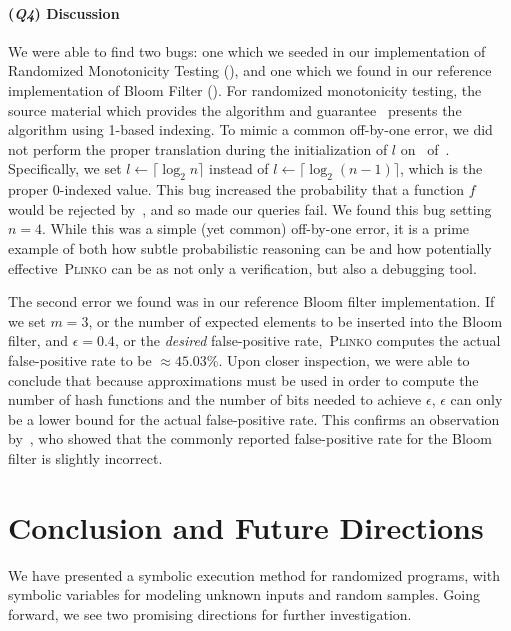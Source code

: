 \documentclass[acmsmall,review,anonymous]{acmart}\settopmatter{printfolios=true,printccs=false,printacmref=false}
\newcommand{\SYSTEM}{\textsc{Plinko}\xspace}
\newcommand{\Q}[1]{(\textit{\textbf{Q#1}})}
\begin{document}
\paragraph*{\Q{4} Discussion}

We were able to find two bugs: one which we seeded in our implementation of Randomized Monotonicity Testing (), and one which we found in our reference implementation of Bloom Filter ().
% 
For randomized monotonicity testing, the source material which provides the
algorithm and guarantee~\citep{goldreich_2017} presents the algorithm using 1-based indexing.
% 
To mimic a common off-by-one error, we did not perform the proper translation during the initialization of $l$ on~ of~.
% 
Specifically, we set $l \gets \lceil \log_2 n \rceil$ instead of $l \gets \lceil \log_2 (n-1) \rceil$, which is the proper 0-indexed value.
% 
This bug increased the probability that a function $f$ would be rejected by~, and so made our queries fail.
% 
We found this bug setting $n = 4$.
% 
While this was a simple (yet common) off-by-one error, it is a prime example of both how subtle probabilistic reasoning can be and how potentially effective~\SYSTEM can be as not only a verification, but also a debugging tool.

The second error we found was in our reference Bloom filter implementation.
% 
If we set $m=3$, or the number of expected elements to be inserted into the Bloom filter, and $\epsilon = 0.4$, or the \textit{desired} false-positive rate,~\SYSTEM computes the actual false-positive rate to be $\approx45.03\%$.
% 
Upon closer inspection, we were able to conclude that because approximations must be used in order to compute the number of hash functions and the number of bits needed to achieve $\epsilon$, $\epsilon$ can only be a lower bound for the actual false-positive rate.
% 
This confirms an observation by~\citet{DBLP:journals/ipl/BoseGKMMMST08}, who showed that the commonly reported false-positive rate for the Bloom filter is slightly incorrect.



\section{Conclusion and Future Directions}
\label{sec:conclusion}

We have presented a symbolic execution method for randomized programs, with
symbolic variables for modeling unknown inputs and random samples. Going
forward, we see two promising directions for further investigation.
\end{document}
